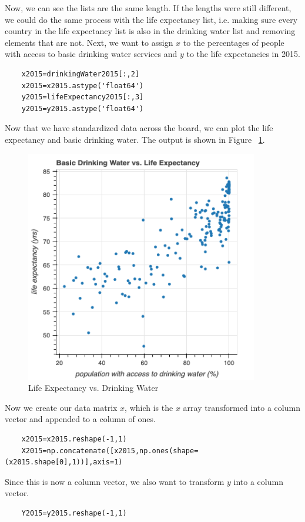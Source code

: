 \documentclass[12pt]{article}
\begin{document}
Now, we can see the lists are the same length. If the lengths were still different, we could do the same process with the life expectancy list, i.e. making sure every country in the life expectancy list is also in the drinking water list and removing elements that are not. Next, we want to assign $x$ to the percentages of people with access to basic drinking water services and $y$ to the life expectancies in 2015.
\begin{verbatim}
    x2015=drinkingWater2015[:,2]
    x2015=x2015.astype('float64')
    y2015=lifeExpectancy2015[:,3]
    y2015=y2015.astype('float64')
\end{verbatim}

Now that we have standardized data across the board, we can plot the life expectancy and basic drinking water. The output is shown in Figure ~\ref{fig3}.
\begin{figure}
    \centering
    \includegraphics[width=4in]{Figures/figure1.png}
    \caption{Life Expectancy vs. Drinking Water}
    \label{fig3}
\end{figure}

Now we create our data matrix $x$, which is the $x$ array transformed into a column vector and appended to a column of ones.
\begin{verbatim}
    x2015=x2015.reshape(-1,1)
    X2015=np.concatenate([x2015,np.ones(shape=(x2015.shape[0],1))],axis=1)
\end{verbatim}

Since this is now a column vector, we also want to transform $y$ into a column vector.
\begin{verbatim}
    Y2015=y2015.reshape(-1,1)
\end{verbatim}
\end{document}
